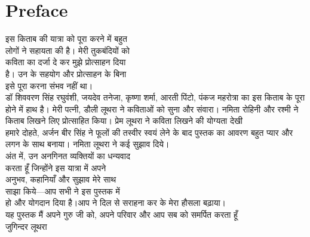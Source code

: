 \chapter{Preface}
\texthindi{
इस किताब की यात्रा को पूरा करने में बहुत\\
लोगों ने सहायता की है। मेरी तुकबंदियों को\\
कविता का दर्जा दे कर मुझे प्रोत्साहन दिया\\
है। उन के सहयोग और प्रोत्साहन के बिना\\
इसे पूरा करना संभव नहीं था।\\
डॉ शिववरण सिंह रघुवंशी, जयदेव तनेजा, कृष्णा शर्मा, आरती पिंटो, पंकज महरोत्रा का इस किताब के पूरा होने में हाथ है। मेरी पत्नी, डौली लूथरा ने कविताओं को सुना और संवारा। नमिता रोहिनी और रश्मी ने किताब लिखने लिए प्रोत्साहित किया। प्रेम लूथरा ने कविता लिखने की योग्यता देखी \\
हमारे दोहते, अर्जन बीर सिंह ने फूलों की तस्वीर स्वयं लेने के बाद पुस्तक का आवरण बहुत प्यार और लगन के साथ बनाया। नमिता लूथरा ने कई सुझाव दिये। \\
अंत में, उन अनगिनत व्यक्तियों का धन्यवाद\\
करता हूँ जिन्होंने इस यात्रा में अपने\\
अनुभव, कहानियाँ और सुझाव मेरे साथ\\
साझा किये—आप सभी ने इस पुस्तक में\\
हो और योगदान दिया है।आप ने दिल से सराहना कर के मेरा हौसला बढ़ाया।\\
यह पुस्तक मैं अपने गुरु जी को, अपने परिवार और आप सब को समर्पित करता हूँ\\
जुगिन्दर लूथरा
}